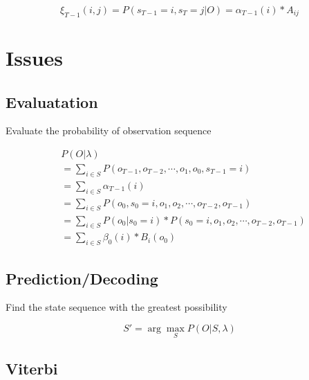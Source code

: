 \documentclass[a4paper,12pt]{article}
\begin{document}
        \begin{equation}
            \xi_{T-1}(i,j)=P(s_{T-1}=i,s_T=j|O)=\alpha_{T-1}(i)*A_{ij}
        \end{equation}

    \section{Issues}

        \subsection{Evaluatation}

            Evaluate the probability of observation sequence

            \begin{equation}
                \begin{split}
                    &P(O|\lambda)\\
                    &=\sum_{i\in S} P(o_{T-1},o_{T-2},\cdots,o_1,o_0,s_{T-1}=i)\\
                    &=\sum_{i\in S} \alpha_{T-1}(i)\\
                    &=\sum_{i\in S} P(o_0,s_0=i,o_1,o_2,\cdots,o_{T-2},o_{T-1})\\
                    &=\sum_{i\in S} P(o_0|s_0=i)*P(s_0=i,o_1,o_2,\cdots,o_{T-2},o_{T-1})\\
                    &=\sum_{i\in S} \beta_{0}(i)*B_{i}(o_0)
                \end{split}
            \end{equation}

        \subsection{Prediction/Decoding}

            Find the state sequence with the greatest possibility

            \begin{equation}
                S'=\arg\max_S P(O|S,\lambda)
            \end{equation}

            \subsection{Viterbi}
\end{document}
